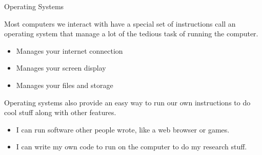 \documentclass[aspectratio=169]{beamer}
\begin{document}
\begin{frame}{Operating Systems}

    Most computers we interact with have a special set of instructions call an operating system that manage a lot of the tedious task of running the computer.

    \begin{itemize}
        \item Manages your internet connection
        \item Manages your screen display
        \item Manages your files and storage
    \end{itemize}

    Operating systems also provide an easy way to run our own instructions to do cool stuff along with other features.

    \begin{itemize}
        \item I can run software other people wrote, like a web browser or games.
        \item I can write my own code to run on the computer to do my research stuff.
    \end{itemize}

\end{frame}
\end{document}
